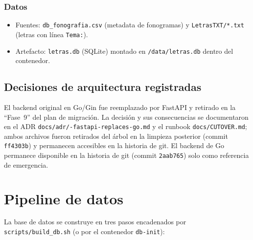 \documentclass[11pt,letterpaper,twoside]{report}
\newcommand{\codigo}[1]{\texttt{#1}}
\begin{document}
\subsection{Datos}
\begin{itemize}
  \item Fuentes: \codigo{db_fonografia.csv} (metadata de fonogramas) y
        \codigo{LetrasTXT/*.txt} (letras con línea \codigo{Tema:}).
  \item Artefacto: \codigo{letras.db} (SQLite) montado en
        \codigo{/data/letras.db} dentro del contenedor.
\end{itemize}

\section{Decisiones de arquitectura registradas}
El backend original en Go/Gin fue reemplazado por FastAPI y retirado
en la ``Fase~9'' del plan de migración. La decisión y sus
consecuencias se documentaron en el ADR
\codigo{docs/adr/-fastapi-replaces-go.md} y el runbook
\codigo{docs/CUTOVER.md}; ambos archivos fueron retirados del árbol en
la limpieza posterior (commit \codigo{ff4303b}) y permanecen accesibles
en la historia de git. El backend de Go permanece
disponible en la historia de git (commit \codigo{2aab765}) solo como
referencia de emergencia.

\chapter{Pipeline de datos}
\label{cap:pipeline}

La base de datos se construye en tres pasos encadenados por
\codigo{scripts/build_db.sh} (o por el contenedor \codigo{db-init}):
\end{document}
